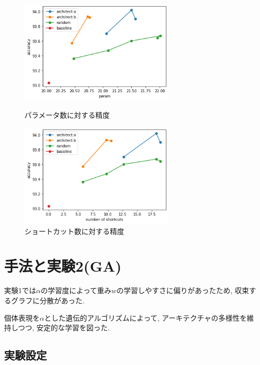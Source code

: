 \documentclass[twocolumn]{jarticle}     %
\begin{document}
\begin{figure}[tb]
 \begin{minipage}{0.5\hsize}
 	\begin{center}
 		\includegraphics[clip,width=75mm]{param.png}
 		\caption{パラメータ数に対する精度}
 		\label{fig:param}
 	\end{center}
 \end{minipage}
 \begin{minipage}{0.5\hsize}
 	\begin{center}
 		\includegraphics[clip,width=75mm]{short.png}
 		\caption{ショートカット数に対する精度}
 		\label{fig:short}
 	\end{center}
 \end{minipage}
\end{figure}





\section{手法と実験2(GA)}
実験1では$\alpha$の学習度によって重み$w$の学習しやすさに偏りがあったため,
収束するグラフに分散があった.

個体表現を$\alpha$とした遺伝的アルゴリズムによって,
アーキテクチャの多様性を維持しつつ, 安定的な学習を図った.

\subsection{実験設定}
\end{document}
